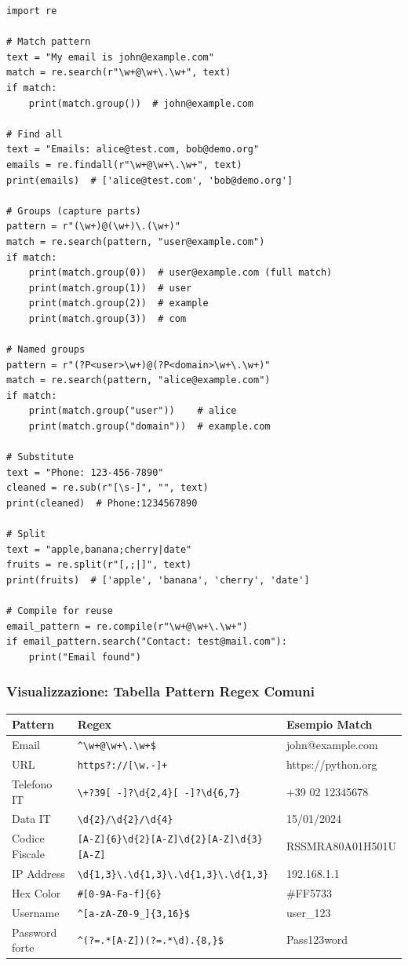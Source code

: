 \begin{lstlisting}
import re

# Match pattern
text = "My email is john@example.com"
match = re.search(r"\w+@\w+\.\w+", text)
if match:
    print(match.group())  # john@example.com

# Find all
text = "Emails: alice@test.com, bob@demo.org"
emails = re.findall(r"\w+@\w+\.\w+", text)
print(emails)  # ['alice@test.com', 'bob@demo.org']

# Groups (capture parts)
pattern = r"(\w+)@(\w+)\.(\w+)"
match = re.search(pattern, "user@example.com")
if match:
    print(match.group(0))  # user@example.com (full match)
    print(match.group(1))  # user
    print(match.group(2))  # example
    print(match.group(3))  # com

# Named groups
pattern = r"(?P<user>\w+)@(?P<domain>\w+\.\w+)"
match = re.search(pattern, "alice@example.com")
if match:
    print(match.group("user"))    # alice
    print(match.group("domain"))  # example.com

# Substitute
text = "Phone: 123-456-7890"
cleaned = re.sub(r"[\s-]", "", text)
print(cleaned)  # Phone:1234567890

# Split
text = "apple,banana;cherry|date"
fruits = re.split(r"[,;|]", text)
print(fruits)  # ['apple', 'banana', 'cherry', 'date']

# Compile for reuse
email_pattern = re.compile(r"\w+@\w+\.\w+")
if email_pattern.search("Contact: test@mail.com"):
    print("Email found")
\end{lstlisting}

\subsubsection{Visualizzazione: Tabella Pattern Regex Comuni}

\begin{center}
\begin{tabular}{|l|l|p{5cm}|}
\hline
\textbf{Pattern} & \textbf{Regex} & \textbf{Esempio Match} \\
\hline
Email & \verb|^\w+@\w+\.\w+$| & john@example.com \\
\hline
URL & \verb|https?://[\w.-]+| & https://python.org \\
\hline
Telefono IT & \verb|\+?39[ -]?\d{2,4}[ -]?\d{6,7}| & +39 02 12345678 \\
\hline
Data IT & \verb|\d{2}/\d{2}/\d{4}| & 15/01/2024 \\
\hline
Codice Fiscale & \verb|[A-Z]{6}\d{2}[A-Z]\d{2}[A-Z]\d{3}[A-Z]| & RSSMRA80A01H501U \\
\hline
IP Address & \verb|\d{1,3}\.\d{1,3}\.\d{1,3}\.\d{1,3}| & 192.168.1.1 \\
\hline
Hex Color & \verb|#[0-9A-Fa-f]{6}| & \#FF5733 \\
\hline
Username & \verb|^[a-zA-Z0-9_]{3,16}$| & user\_123 \\
\hline
Password forte & \verb|^(?=.*[A-Z])(?=.*\d).{8,}$| & Pass123word \\
\hline
\end{tabular}
\end{center}

